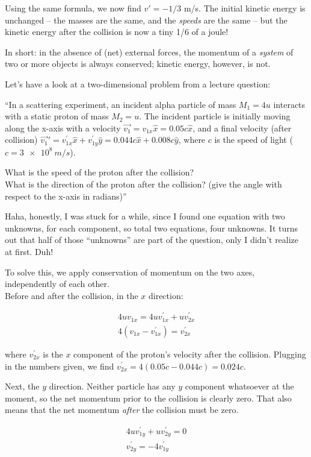 Using the same formula, we now find $v' = -1/3$ m/s. The initial kinetic energy is unchanged -- the masses are the same, and the \emph{speeds} are the same -- but the kinetic energy after the collision is now a tiny 1/6 of a joule!

In short: in the absence of (net) external forces, the momentum of a \emph{system} of two or more objects is always conserved; kinetic energy, however, is not.

Let's have a look at a two-dimensional problem from a lecture question:

``In a scattering experiment, an incident alpha particle of mass $M_1 = 4u$ interacts with a static proton of mass $M_2 = u$. The incident particle is initially moving along the x-axis with a velocity $\vec{v_1} = v_{1x} \hat{x} = 0.05 c \hat{x}$, and a final velocity (after collision) $\vec{v_1}' = v_{1x}^{'} \hat{x} + v_{1y}^{'} \hat{y} = 0.044 c \hat{x} + 0.008 c \hat{y}$, where $c$ is the speed of light ($c = \SI{3e8}{m/s}$).

What is the speed of the proton after the collision?\\
What is the direction of the proton after the collision? (give the angle with respect to the x-axis in radians)''

Haha, honestly, I was stuck for a while, since I found one equation with two unknowns, for each component, so total two equations, four unknowns. It turns out that half of those ``unknowns'' are part of the question, only I didn't realize at first. Duh!

To solve this, we apply conservation of momentum on the two axes, independently of each other.\\
Before and after the collision, in the $x$ direction:

\begin{align}
4 u v_{1x} = 4 u v_{1x}^{'} + u v_{2x}^{'}\\
4 (v_{1x} - v_{1x}^{'}) = v_{2x}^{'}
\end{align}

where $v_{2x}^{'}$ is the $x$ component of the proton's velocity after the collision. Plugging in the numbers given, we find $v_{2x}^{'} = 4(0.05c - 0.044c) = 0.024c$.

Next, the $y$ direction. Neither particle has any $y$ component whatsoever at the moment, so the net momentum prior to the collision is clearly zero. That also means that the net momentum \emph{after} the collision must be zero.

\begin{align}
4 u v_{1y}^{'} + u v_{2y}^{'} = 0\\
v_{2y}^{'} = -4 v_{1y}^{'}
\end{align}

